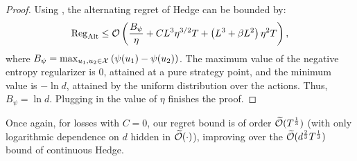 \begin{proof}
    Using , the alternating regret of Hedge can be bounded by:
    \[
    \mathrm{Reg}_{\mathrm{Alt}}\le \mathcal{O}\left(\frac{B_\psi}{\eta}+CL^3\eta^{3/2}T+\left(L^3+\beta L^2\right)\eta^2 T\right),
    \]
    where $B_\psi = \max_{u_1,u_2\in{\mathcal{X}}}\left(\psi(u_1)-\psi(u_2)\right)$. 
    The maximum value of the negative entropy regularizer is $0$, attained at a pure strategy point, and the minimum value is $-\ln d$, attained by the uniform distribution over the actions. Thus, $B_\psi = \ln d$. Plugging in the value of $\eta$ finishes the proof.
\end{proof}

Once again, for losses with $C=0$, our regret bound is of order $\widetilde{\mathcal{O}}(T^\frac{1}{3})$ (with only logarithmic dependence on $d$ hidden in $\widetilde{\mathcal{O}}(\cdot)$), improving over the $\widetilde{\mathcal{O}}(d^{\frac{2}{3}}T^\frac{1}{3})$ bound of continuous Hedge.
